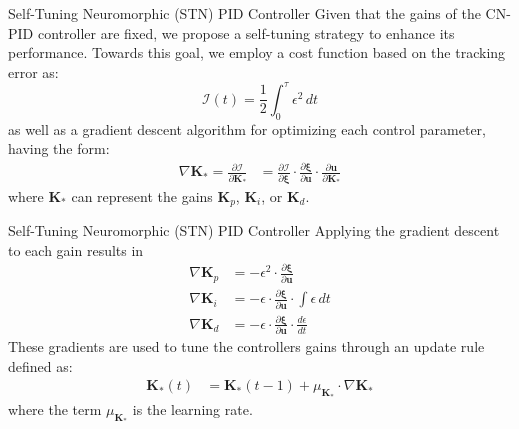 \documentclass{beamer}
\begin{document}
\begin{frame}{Self-Tuning Neuromorphic (STN) PID Controller}
Given that the gains of the CN-PID controller are fixed, we propose a self-tuning strategy to enhance its performance. Towards this goal, we employ a cost function based on the tracking error as:\\
\vspace{-0.2cm}
\begin{equation}
\mathcal{I}(t) = \frac{1}{2} \int^{\tau}_0 \epsilon^2 \, dt
\end{equation}
as well as a gradient descent algorithm for optimizing each control parameter, having the form:
\begin{align}
\nabla \mathbf{K}_* = \frac{\partial \mathcal{I}}{\partial \mathbf{K}_*} &= \frac{\partial \mathcal{I}}{\partial \boldsymbol{\xi}} \cdot \frac{\partial \boldsymbol{\xi}}{\partial \mathbf{u}} \cdot \frac{\partial \mathbf{u}}{\partial \mathbf{K}_*}
\end{align}
where $\mathbf{K}_*$ can represent the gains $\mathbf{K}_p$, $\mathbf{K}_i$, or $\mathbf{K}_d$.\\ 

\end{frame}



\begin{frame}{Self-Tuning Neuromorphic (STN) PID Controller}
Applying the gradient descent to each gain results in
\begin{align}
        \nabla \mathbf{K}_p &=  -\epsilon^2 \cdot \frac{\partial \boldsymbol{\xi}}{\partial \mathbf{u}} \label{eq:partial_Kp} \\
        \nabla \mathbf{K}_i &=  -\epsilon \cdot \frac{\partial \boldsymbol{\xi}}{\partial \mathbf{u}} \cdot \int \epsilon \, dt \label{eq:partial_Ki} \\
        \nabla \mathbf{K}_d &=  -\epsilon \cdot \frac{\partial \boldsymbol{\xi}}{\partial \mathbf{u}} \cdot \frac{d \epsilon}{dt}  \label{eq:partial_Kd}
\end{align} 
These gradients are used to tune the controllers gains through an update rule defined as:
\begin{align}
\mathbf{K}_{*}(t)  &= \mathbf{K}_{*}(t-1)  + \mu_{\mathbf{K}_{*}} \cdot \nabla \mathbf{K}_{*}
\end{align}
where the term $\mu_{\mathbf{K}_{*}}$ is the learning rate.

\end{frame}
\end{document}
